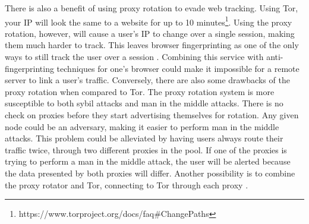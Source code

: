 There is also a benefit of using proxy rotation to evade web tracking. Using Tor, your IP will look the same to a website for up to 10 minutes\footnote{https://www.torproject.org/docs/faq\#ChangePaths}. Using the proxy rotation, however, will cause a user’s IP to change over a single session, making them much harder to track. This leaves browser fingerprinting as one of the only ways to still track the user over a session . Combining this service with anti-fingerprinting techniques for one's browser could make it impossible for a remote server to link a user's traffic.
    Conversely, there are also some drawbacks of the proxy rotation when compared to Tor. The proxy rotation system is more susceptible to both sybil attacks and man in the middle attacks. There is no check on proxies before they start advertising themselves for rotation. Any given node could be an adversary, making it easier to perform man in the middle attacks. This problem could be alleviated by having users always route their traffic twice, through two different proxies in the pool. If one of the proxies is trying to perform a man in the middle attack, the user will be alerted because the data presented by both proxies will differ. Another possibility is to combine the proxy rotator and Tor, connecting to Tor through each proxy . 

